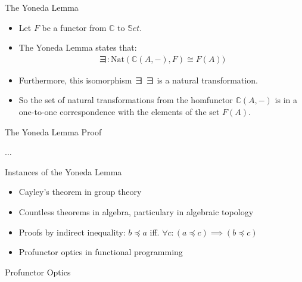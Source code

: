 \documentclass[aspectratio=169]{beamer} %
\newcommand{\bC}{\mathbb{C}}
\newcommand{\bS}{\mathbb{S}}
\newcommand{\yo}{ヨ}
\begin{document}
{\begin{frame}{The Yoneda Lemma}
    \begin{itemize}
        \item Let $F$ be a functor from $\bC$ to $\bS et$.
        \pause\item The Yoneda Lemma states that:
        \begin{align*}
            \yo : \text{Nat}(\bC(A,-), F) \cong F(A))
        \end{align*}
        \pause\item Furthermore, this isomorphism $\yo$ ヨ is a natural transformation.
        \pause\item So the set of natural transformations from the homfunctor $\bC(A,-)$ is in a one-to-one correspondence with the elements of the set $F(A)$.
    \end{itemize}
\end{frame}
\begin{frame}{The Yoneda Lemma}
Proof
\end{frame}
\begin{frame}
 $\hdots$
\end{frame}
\begin{frame}{Instances of the Yoneda Lemma}
\begin{itemize}
 \item Cayley's theorem in group theory
 \item Countless theorems in algebra, particulary in algebraic topology
 \item Proofs by indirect inequality: $b \preceq a$ iff. $\forall c : (a \preceq c) \implies (b \preceq c)$
 \item Profunctor optics in functional programming
\end{itemize}

\end{frame}
\begin{frame}{Profunctor Optics}
\end{frame}

}
\end{document}
